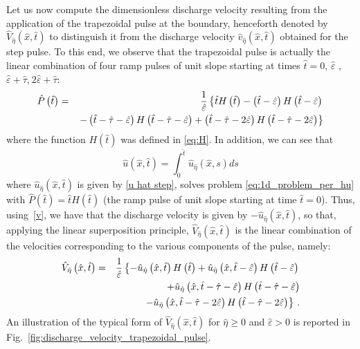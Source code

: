 \documentclass[12pt,a4paper]{amsart}
\theoremstyle{definition}
\newcommand{\hatt}{\hat{t}}
\begin{document}
Let us now compute the dimensionless
discharge velocity resulting from the application of the trapezoidal pulse at the boundary, henceforth denoted by $\hat{V}_{\hat{\eta}}\left( \hat{x},\hat{t}%
\right) $ to distinguish it from the discharge velocity $\hat{v}_{\hat{\eta}}\left( \hat{x},\hat{t}%
\right) $ obtained for the step pulse. To this end, we observe that the trapezoidal pulse is actually the linear combination of four
ramp pulses of unit slope starting at times $\hat{t}=0$, $\hat{\varepsilon}$%
, $\hat{\varepsilon}+\hat{\tau}$,$\ 2\hat{\varepsilon}+\hat{\tau}$:%
\begin{eqnarray}\label{eq:trap_P}
\hat{P}\left( \hat{t}\right)  &=&\frac{1}{\hat{\varepsilon}}\left\{ \hat{t}%
H\left( \hat{t}\right) -\left( \hat{t}-\hat{\varepsilon}\right) H\left( \hat{%
t}-\hat{\varepsilon}\right) \right. \\
&&\left. -\left( \hat{t}-\hat{\tau}-\hat{\varepsilon}\right) H\left( \hat{t}-%
\hat{\tau}-\hat{\varepsilon}\right) +\left( \hat{t}-\hat{\tau}-2\hat{%
\varepsilon}\right) H\left( \hat{t}-\hat{\tau}-2\hat{\varepsilon}\right)
\right\} \notag
\end{eqnarray}%
where the function $H(\hatt)$ was defined in \eqref{eq:H}.
In addition, we can see that
\begin{equation*}
\hat{u}\left( \hat{x},\hat{t}\right) =\int_{0}^{\hat{t}}\hat{u}_{\hat{\eta}%
}\left( \hat{x},s\right) ds
\end{equation*}%
where $\hat{u}_{\hat{\eta}}\left( \hat{x},\hat{t}\right)$ is given by \eqref{u hat step}, solves problem \eqref{eq:1d_problem_per_hu} with $\hat{P}\left( \hat{t}\right) =\hat{t}H\left( \hat{t}\right)$
(the ramp pulse of unit slope starting at time $\hat{t}=0$).
Thus, using~\eqref{v}, we have that the discharge velocity is given by
$-\hat{u}_{\hat{\eta}}\left( \hat{x},\hat{t}\right)$, so that, applying the linear superposition principle, $\hat{V}_{\hat{\eta}}\left( \hat{x},\hat{t}\right) $ is the linear combination of the
velocities corresponding to the various components of the pulse, namely:%
\begin{eqnarray}
\hat{V}_{\hat{\eta}}\left( \hat{x},\hat{t}\right)  &=&\frac{1}{\hat{%
\varepsilon}}\left\{ -\hat{u}_{\hat{\eta}}\left( \hat{x},\hat{t}\right)
H\left( \hat{t}\right) +\hat{u}_{\hat{\eta}}\left( \hat{x},\hat{t}-\hat{%
\varepsilon}\right) H\left( \hat{t}-\hat{\varepsilon}\right) \right.
\label{V_max} \notag\\
&&+\hat{u}_{\hat{\eta}}\left( \hat{x},\hat{t}-\hat{\tau}-\hat{%
\varepsilon}\right) H\left( \hat{t}-\hat{\tau}-\hat{\varepsilon}\right) \\
&&\left. -
\hat{u}_{\hat{\eta}}\left( \hat{x},\hat{t}-\hat{\tau}-2\hat{\varepsilon}%
\right) H\left( \hat{t}-\hat{\tau}-2\hat{\varepsilon}\right) \right\}\,.
\notag
\end{eqnarray}
An illustration of the typical form of
$\hat{V}_{\hat{\eta}}\left( \hat{x},\hat{t}\right) $ for $\hat{\eta} \geq 0$ and $\hat{\varepsilon}>0$ is reported
in Fig.~\ref{fig:discharge_velocity_trapezoidal_pulse}.
\end{document}
